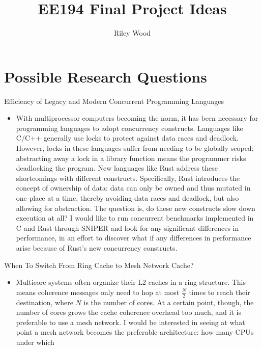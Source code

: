 \documentclass{article}
\title{EE194 Final Project Ideas}
\author{Riley Wood}
\begin{document}
\maketitle


\section*{Possible Research Questions}

\begin{enumerate}
    \begin{minipage}{\textwidth}
    \item Efficiency of Legacy and Modern Concurrent Programming Languages
        \begin{itemize}
            \item With multiprocessor computers becoming the norm, it has been necessary for programming languages to adopt concurrency constructs. Languages like C/C++ generally use locks to protect against data races and deadlock. However, locks in these languages suffer from needing to be globally scoped; abstracting away a lock in a library function means the programmer risks deadlocking the program. New languages like Rust address these shortcomings with different
                constructs. Specifically, Rust introduces the concept of ownership of data: data can only be owned and thus mutated in one place at a time, thereby avoiding data races and deadlock, but also allowing for abstraction. The question is, do these new constructs slow down execution at all? I would like to run concurrent benchmarks implemented in C and Rust through SNIPER and look for any significant differences in performance, in an effort to discover what if any differences in
                performance arise because of Rust's new concurrency constructs.\\
        \end{itemize}
    \end{minipage}
    \begin{minipage}{\textwidth}
    \item When To Switch From Ring Cache to Mesh Network Cache?
         \begin{itemize}
             \item Multicore systems often organize their L2 caches in a ring structure. This means coherence messages only need to hop at most \( \frac{N}{2} \) times to reach their destination, where \(N\) is the number of cores. At a certain point, though, the number of cores grows the cache coherence overhead too much, and it is preferable to use a mesh network. I would be interested in seeing at what point a mesh network becomes the preferable architecture: how many CPUs under which

\end{itemize}
\end{minipage}
\end{enumerate}
\end{document}
